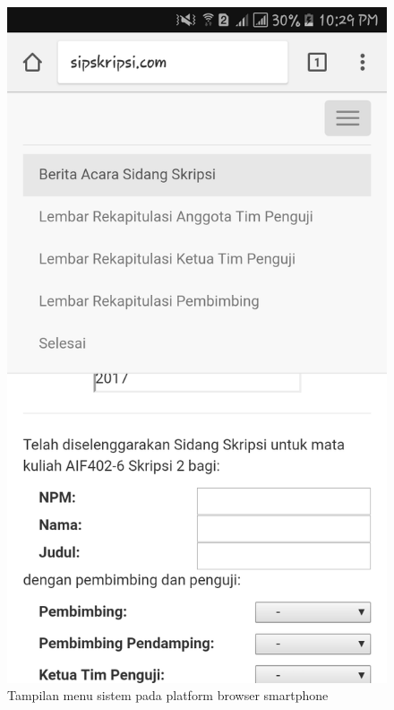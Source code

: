 \begin{figure}[H]
	\centering
	\includegraphics[scale=0.2]{Gambar/hp_menu}
	\caption{Tampilan menu sistem pada platform browser smartphone}
	\label{fig:hp_menu}
\end{figure}

